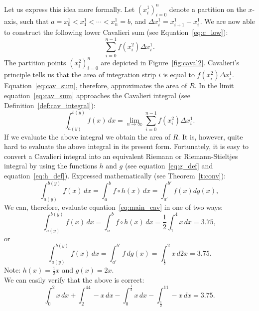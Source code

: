 \documentclass[twoside,reqno,11pt]{fcaa-var} %
\begin{document}
\noindent
Let us express this idea more formally. Let $(x_i^1)_{i=0}^{n}$ denote a partition on the $x$-axis, such that $a = x_0^1 < x_1^1 < \cdots < x_n^1 = b$, and $\Delta x_i^1 = x_{i+1}^1 - x_i^1$. We are now able to construct the following lower Cavalieri sum (see Equation~\ref{eq:c_low}):
\begin{equation}
\label{eq:cav_sum}
\sum_{i=0}^{n-1} f(x_i^2)\Delta x_i^1.
\end{equation}
The partition points $(x_i^2)_{i=0}^{n}$ are depicted in Figure~\ref{fig:caval2}. Cavalieri's principle tells us that the area of integration strip $i$ is equal to $f(x_i^2)\Delta x_i^1$. Equation~\eqref{eq:cav_sum}, therefore, approximates the area of $R$. In the limit equation~\eqref{eq:cav_sum} approaches 
the Cavalieri integral (see Definition~\ref{def:cav_integral}):
\begin{equation}
\label{eq:caval1}
\int_{a(y)}^{b(y)}f(x)\, dx = \lim_{n\to \infty}\sum_{i=0}^{n-1} f(x_i^2)\Delta x_i^1.
\end{equation}
If we evaluate the above integral we obtain the area of $R$. It is, however, quite hard to evaluate the above integral in its present form. Fortunately, it is easy to convert a Cavalieri integral into an equivalent Riemann or Riemann-Stieltjes 
integral by using the functions $h$ and $g$ (see equation~\ref{eq:g_def} and equation~\ref{eq:h_def}). Expressed mathematically (see Theorem~\ref{t:conv}):
\begin{equation}
\label{eq:main_cav}
\int_{a(y)}^{b(y)}f(x)\,dx =\int_a^b f \circ h (x)\, dx = \int_{a'}^{b'} f(x) dg(x),
\end{equation}
We can, therefore, evaluate equation~\ref{eq:main_cav} in one of two ways:
\begin{equation}
\int_{a(y)}^{b(y)}f(x)\, dx = \int_a^b f \circ h (x)\, dx = \dfrac{1}{2}\int_1^4x\, dx = 3.75,  
\end{equation}
or
\begin{equation}
\int_{a(y)}^{b(y)}f(x)\, dx = \int_{a'}^{b'} f \, dg(x) = \int_{\frac{1}{2}}^2x\, d2x = 3.75.  
\end{equation}
Note: $h(x) = \frac{1}{2}x$ and $g(x) = 2x$.\\ 

\noindent
We can easily verify that the above is correct:
\begin{equation}
\int_0^2x\, dx+\int_2^44-x\, dx- \int_0^{\frac{1}{2}}x\, dx-\int_{\frac{1}{2}}^11-x\, dx = 3.75. 
\end{equation}
\end{document}
